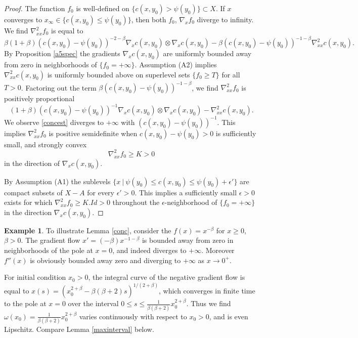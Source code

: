\documentclass[12pt]{amsart}
\theoremstyle{definition}
\newtheorem{exx}{Example}
\theoremstyle{remark}
\begin{document}
\begin{proof}
The function $f_0$ is well-defined on $\{c(x,y_0)>\psi(y_0)\} \subset X$. If $x$ converges to $x_\infty \in \{c(x,y_0) \leq \psi(y_0)\}$, then both $f_0$, $\nabla_x f_0$ diverge to infinity.  We find $\nabla^2_{xx} f_0$ is equal to $$\beta(1+\beta) (c(x,y_0)-\psi(y_0))^{-2-\beta} \nabla_x c(x,y_0) \otimes \nabla_x c(x,y_0)-\beta (c(x,y_0)-\psi(y_0))^{-1-\beta} \nabla^2_{xx} c(x,y_0).$$ By Proposition \ref{a5spec} the gradients $\nabla_x c(x,y_0)$ are uniformly bounded away from zero in neighborhoods of $\{f_0=+\infty\}$. Assumption (A2) implies $\nabla^2_{xx} c(x,y_0)$ is uniformly bounded above on superlevel sets $\{f_0 \geq T\}$ for all $T>0$. Factoring out the term $\beta (c(x,y_0)-\psi(y_0))^{-1-\beta}$, we find $\nabla_{xx}^2 f_0$ is positively proportional \begin{equation}\label{concest} (1+\beta)(c(x,y_0)-\psi(y_0))^{-1} \nabla_x c(x,y_0) \otimes \nabla_x c(x,y_0) - \nabla_{xx}^2 c(x,y_0).\end{equation} We observe \eqref{concest} diverges to $+\infty$ with $(c(x,y_0)-\psi(y_0))^{-1}$. This implies $\nabla^2_{xx} f_0$ is positive semidefinite when $c(x,y_0)-\psi(y_0)>0$ is sufficiently small, and strongly convex $$\nabla_{xx}^2 f_0 \geq K >0$$ in the direction of $\nabla_x c(x,y_0)$. 

By Assumption (A1) the sublevels $\{x ~|~\psi(y_0)\leq c(x,y_0) \leq \psi(y_0)+\epsilon'\}$ are compact subsets of $X-A$ for every $\epsilon'>0$. This implies a sufficiently small $\epsilon>0$ exists for which $\nabla^2_{xx} f_0\geq K.Id>0$ throughout the $\epsilon$-neighborhood of $\{f_0=+\infty\}$ in the direction $\nabla_x c(x,y_0)$. 
\end{proof}

\begin{exx} 
To illustrate Lemma \ref{conc}, consider the $f(x)=x^{-\beta}$ for $x\geq 0$, $\beta>0$. The gradient flow $x'= (-\beta)x^{-1-\beta}$ is bounded away from zero in neighborhoods of the pole at $x=0$, and indeed diverges to $+\infty$. Moreover $f''(x)$ is obviously bounded away zero and diverging to $+\infty$ as $x\to 0^+$. 

For initial condition $x_0>0$, the integral curve of the negative gradient flow is equal to $x(s)=(x_0^{2+\beta} - \beta(\beta+2)s)^{1/(2+\beta)}$, which converges in finite time to the pole at $x=0$ over the interval $0\leq s\leq \frac{1}{\beta(\beta+2)}x_0^{2+\beta}$. Thus we find $\omega(x_0)=\frac{1}{\beta(\beta+2)}x_0^{2+\beta}$ varies continuously with respect to $x_0>0$, and is even Lipschitz. Compare Lemma \ref{maxinterval} below. 

\end{exx}
\end{document}
